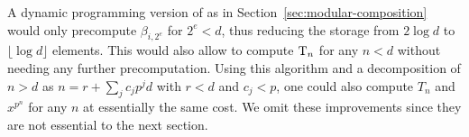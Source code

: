 \begin{remark}
  A dynamic programming version of  as
  in Section~\ref{sec:modular-composition} would only precompute
  $\beta_{i,2^e}$ for $2^e<d$, thus reducing the storage from $2\log
  d$ to $\lfloor\log d\rfloor$ elements. This would also allow to
  compute $\operatorname{T}_n$ for any $n<d$ without needing any further
  precomputation. Using this algorithm and a decomposition of $n>d$ as
  $n=r+\sum_jc_jp^jd$ with $r<d$ and $c_j<p$, one could also compute
  $T_{n}$ and $x^{p^n}$ for any $n$ at essentially the same cost. We
  omit these improvements since they are not essential to the next
  section.
\end{remark}

%
